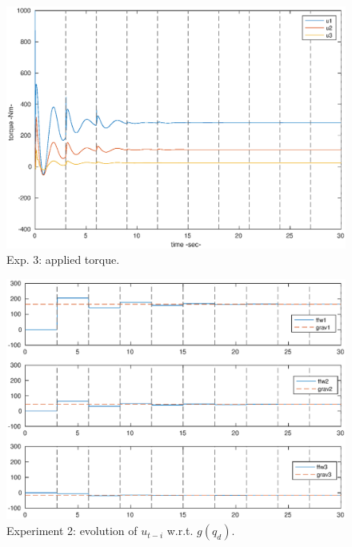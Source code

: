 \begin{center}
\begin{figure}[h!]
\begin{minipage}[h!]{0.45\linewidth}
\includegraphics[scale=0.35]{figures/2_2_ceff.eps}
\caption{\label{2_2ceff}
Exp. 3: applied torque.}
\label{fig:assumpt}
\end{minipage}
\end{figure}
\end{center}

\begin{figure}[h!]
\centerline{\includegraphics[scale=0.42]{figures/2_1_gravff.eps}}
\caption{\label{2_1gravff}
Experiment 2: evolution of \(u_{t-i}\) w.r.t. \(g(q_d)\).}
\end{figure}

